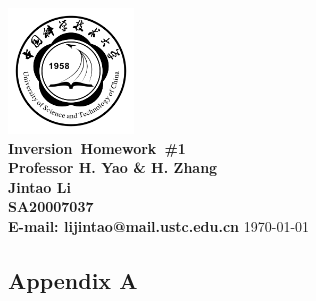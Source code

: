 \documentclass{article}
\makeatletter
\newcommand{\hmwkTitle}{Homework\ \#1}
\newcommand{\hmwkClass}{Inversion}
\newcommand{\hmwkClassInstructor}{Professor H. Yao \& H. Zhang}
\newcommand{\hmwkAuthorName}{\textbf{Jintao Li}}
\newcommand{\hmwkAuthorID}{\textbf{SA20007037}}
\newcommand{\hmwkAuthoremail}{\textbf{E-mail: lijintao@mail.ustc.edu.cn}}
\makeatother
\begin{document}
\begin{titlepage}

\begin{center}

\textcolor{ustcblue}{\includegraphics[width=0.25\textwidth]{./ustc_logo_fig.pdf} \\ [1cm]}
{ \Huge \bfseries \hmwkClass\ \hmwkTitle}\\[1cm]

\large \textbf{\hmwkClassInstructor} \\ [5cm]

\large \hmwkAuthorName \\ [0.25cm]
\large \hmwkAuthorID \\ [0.25cm]
\large \hmwkAuthoremail
\vfill
{\large \today}

\end{center}

\end{titlepage}

\begin{center}
\section{Appendix A}
\end{center}
\end{document}
